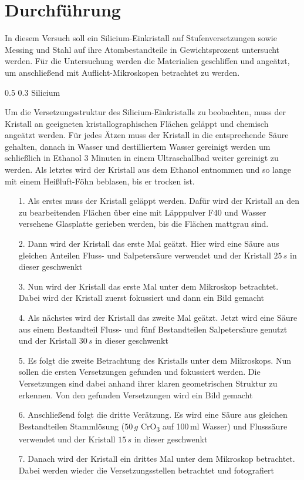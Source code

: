 \documentclass[german, %
parskip=full, %
bibliography=totoc, %
]{scrartcl}
\makeatletter
\renewcommand\subsection{\@startsection 
   {subsection}{2}{0mm}%
   {0.5\baselineskip}%
   {0.3\baselineskip}%
   {\bfseries\sffamily\large}%
   }
\makeatother
\begin{document}
\section{Durchführung}

In diesem Versuch soll ein Silicium-Einkristall auf Stufenversetzungen sowie Messing und Stahl auf ihre Atombestandteile in Gewichtsprozent untersucht werden. Für die Untersuchung werden die Materialien geschliffen und angeätzt, um anschließend mit Auflicht-Mikroskopen betrachtet zu werden.

\subsection{Silicium}

Um die Versetzungsstruktur des Silicium-Einkristalls zu beobachten, muss der Kristall an geeigneten kristallographischen Flächen geläppt und chemisch angeätzt werden. Für jedes Ätzen muss der Kristall in die entsprechende Säure gehalten, danach in Wasser und destilliertem Wasser gereinigt werden um schließlich in Ethanol 3 Minuten in einem Ultraschallbad weiter gereinigt zu werden. Als letztes wird der Kristall aus dem Ethanol entnommen und so lange mit einem Heißluft-Föhn beblasen, bis er trocken ist. 
\begin{itemize}
\item[1.] Als erstes muss der Kristall geläppt werden. Dafür wird der Kristall an den zu bearbeitenden Flächen über eine mit Läpppulver F40 und Wasser versehene Glasplatte gerieben werden, bis die Flächen mattgrau sind.
\item[2.] Dann wird der Kristall das erste Mal geätzt. Hier wird eine Säure aus gleichen Anteilen Fluss- und Salpetersäure verwendet und der Kristall $25\,s$ in dieser geschwenkt
\item[3.] Nun wird der Kristall das erste Mal unter dem Mikroskop betrachtet. Dabei wird der Kristall zuerst fokussiert und dann ein Bild gemacht
\item[4.] Als nächstes wird der Kristall das zweite Mal geätzt. Jetzt wird eine Säure aus einem Bestandteil Fluss- und fünf Bestandteilen Salpetersäure genutzt und der Kristall $30\,s$ in dieser geschwenkt
\item[5.] Es folgt die zweite Betrachtung des Kristalls unter dem Mikroskops. Nun sollen die ersten Versetzungen gefunden und fokussiert werden. Die Versetzungen sind dabei anhand ihrer klaren geometrischen Struktur zu erkennen. Von den gefunden Versetzungen wird ein Bild gemacht
\item[6.] Anschließend folgt die dritte Verätzung. Es wird eine Säure aus gleichen Bestandteilen Stammlösung ($50\,g$ CrO\textsubscript{3} auf 100\,ml Wasser) und Flusssäure verwendet und der Kristall $15\,s$ in dieser geschwenkt
\item[7.] Danach wird der Kristall ein drittes Mal unter dem Mikroskop betrachtet. Dabei werden wieder die Versetzungsstellen betrachtet und fotografiert
\end{itemize}
\end{document}
